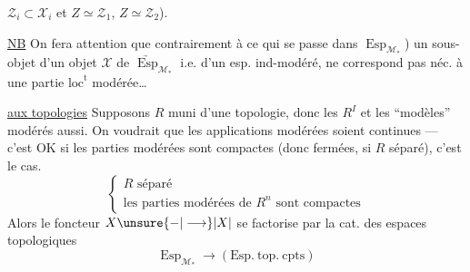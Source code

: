 $\mathcal Z_i\subset\mathcal X_i$ et $Z\simeq\mathcal Z_1$, $Z\simeq\mathcal Z_2$).

\uline{NB} On fera attention que contrairement à ce qui se passe dans $\operatorname{Esp}_{\mathcal M_*}$) un sous-objet d'un objet $\mathcal X$ de $\underrightarrow{\operatorname{Esp}}_{\mathcal M_*}$ i.e. d'un esp. ind-modéré, ne correspond pas néc. à une partie $\mathrm{loc}^{\mathrm t}$ modérée\ldots

\uline{ aux topologies} Supposons $R$ muni d'une topologie,  donc les $R^I$ et les ``modèles'' modérés aussi. On voudrait que les applications modérées soient continues --- c'est OK si les parties modérées sont compactes (donc fermées, si $R$ séparé), c'est le cas.  
\[
 \left\{\begin{array}{l}R\text{ séparé}\\
 \text{les parties modérées de }R^n\text{ sont compactes}
 \end{array}\right.
\]
Alors le foncteur $X\unsure{-|\longrightarrow}|X|$ se factorise par la cat. des espaces topologiques
\[
 \operatorname{Esp}_{\mathcal M_*}\longrightarrow(\mathrm{Esp.\ top.\ cpts})
\]

